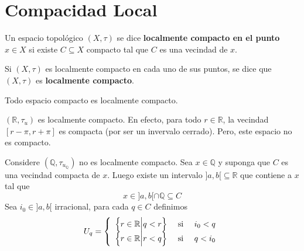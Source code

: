 \documentclass[12pt]{report}
\theoremstyle{largebreak}
\begin{document}
    \section{Compacidad Local}

    \begin{mydef}
        Un espacio topológico $(X,\tau)$ se dice \textbf{localmente compacto en el punto $x\in X$} si existe $C\subseteq X$ compacto tal que $C$ es una vecindad de $x$.

        Si $(X,\tau)$ es localmente compacto en cada uno de sus puntos, se dice que $(X,\tau)$ es \textbf{ localmente compacto}.
    \end{mydef}

    \begin{obs}
        Todo espacio compacto es localmente compacto.
    \end{obs}

    \begin{exa}
        $(\mathbb{R},\tau_u)$ es localmente compacto. En efecto, para todo $r\in\mathbb{R}$, la vecindad $[r-\pi,r+\pi]$ es compacta (por ser un invervalo cerrado). Pero, este espacio no es compacto.
    \end{exa}

    \begin{exa}
        Considere $(\mathbb{Q},\tau_{ u_{\mathbb{Q}}})$ no es localmente compacto. Sea $x\in\mathbb{Q}$ y suponga que $C$ es una vecindad compacta de $x$. Luego existe un intervalo $]a,b[\subseteq\mathbb{R}$ que contiene a $x$ tal que
        \begin{equation*}
            x\in ]a,b[\cap\mathbb{Q}\subseteq C
        \end{equation*}
        Sea $i_0\in]a,b[$ irracional, para cada $q\in C$ definimos
        \begin{equation*}
            U_q=\left\{
                \begin{array}{lcr}
                    \left\{r\in\mathbb{R}\Big|q<r \right\} & \textup{ si } & i_0<q\\
                    \left\{r\in\mathbb{R}\Big|r<q \right\} & \textup{ si } & q<i_0\\
                \end{array}
            \right.
        \end{equation*}
    \end{exa}
    
\end{document}
